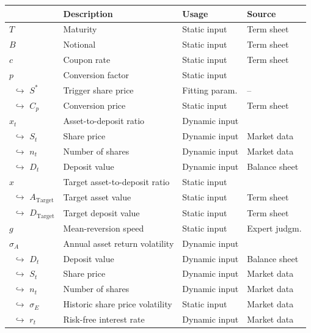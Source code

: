 \begin{table}
 \setlength{\extrarowheight}{2.5pt}
 \centering
 \footnotesize
 \begin{tabular}{p{1.8cm}p{6.8cm}p{2.4cm}p{2.5cm}}
  \toprule
    & \textbf{Description} & \textbf{Usage} & \textbf{Source} \\
  \midrule
   $T$ & Maturity & Static input & Term sheet\\
   $B$ & Notional & Static input & Term sheet \\
   $c$ & Coupon rate & Static input & Term sheet\\ 
   $p$ & Conversion factor & Static input & \\
   $\,\,\,$$\hookrightarrow$ $S^*$ & Trigger share price & Fitting param. & --\\
   $\,\,\,$$\hookrightarrow$ $C_p$ & Conversion price & Static input & Term sheet\\
   $x_t$ & Asset-to-deposit ratio & Dynamic input & \\
   $\,\,\,$$\hookrightarrow$ $S_t$ & Share price & Dynamic input & Market data\\
   $\,\,\,$$\hookrightarrow$ $n_t$ & Number of shares & Dynamic input & Market data\\
   $\,\,\,$$\hookrightarrow$ $D_t$ & Deposit value & Dynamic input & Balance sheet\\
   $\hat{x}$ & Target asset-to-deposit ratio & Static input & \\
   $\,\,\,$$\hookrightarrow$ $A_\text{Target}$ & Target asset value & Static input & Term sheet \\
   $\,\,\,$$\hookrightarrow$ $D_\text{Target}$ & Target deposit value & Static input & Term sheet\\
   $g$ & Mean-reversion speed & Static input & Expert judgm.  \\
   $\sigma_A$ & Annual asset return volatility & Dynamic input & \\
   $\,\,\,$$\hookrightarrow$ $D_t$ & Deposit value & Dynamic input & Balance sheet\\
   $\,\,\,$$\hookrightarrow$ $S_t$ & Share price & Dynamic input & Market data\\
   $\,\,\,$$\hookrightarrow$ $n_t$ & Number of shares & Dynamic input & Market data\\
   $\,\,\,$$\hookrightarrow$ $\sigma_E$& Historic share price volatility & Static input & Market data\\
   $\,\,\,$$\hookrightarrow$ $r_t$ & Risk-free interest rate & Dynamic input & Market data \\

\end{tabular}
\end{table}
